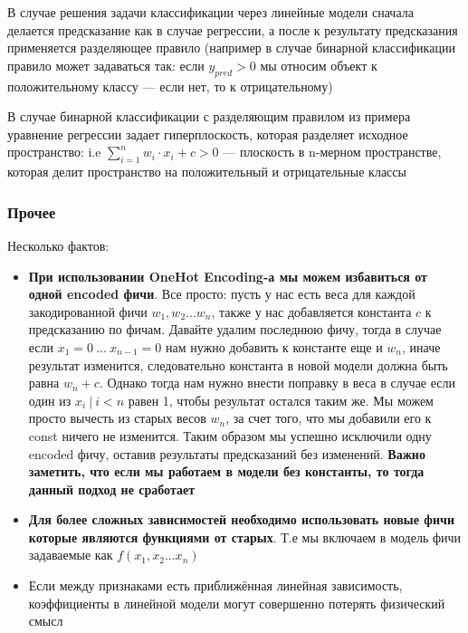 \documentclass{article}
\begin{document}
    В случае решения задачи классификации через линейные модели сначала делается предсказание как в случае регрессии, а после
    к результату предсказания применяется разделяющее правило (например в случае бинарной классификации правило может задаваться так:
    если $y_{pred} > 0$ мы относим объект к положительному классу --- если нет, то к отрицательному)

    В случае бинарной классификации с разделяющим правилом из примера уравнение регрессии задает гиперплоскость,
    которая разделяет исходное пространство: i.e $\sum_{i = 1}^{n}{w_{i} \cdot x_{i}} + c > 0$ --- плоскость в n-мерном пространстве,
    которая делит пространство на положительный и отрицательные классы

    \subsubsection{Прочее}

    Несколько фактов:

    \begin{itemize}
        \item \textbf{При использовании OneHot Encoding-а мы можем избавиться от одной encoded фичи}.
        Все просто: пусть у нас есть веса для каждой закодированной фичи $w_{1}, w_{2} ... w_{n}$, также у нас добавляется константа $c$
        к предсказанию по фичам.
        Давайте удалим последнюю фичу, тогда в случае если $x_{1} = 0 \ ... \ x_{n-1} = 0$ нам нужно добавить к константе еще и $w_{n}$, иначе результат изменится, следовательно
        константа в новой модели должна быть равна $w_{n} + c$. 
        Однако тогда нам нужно внести поправку в веса в случае если один из $x_{i} \ | \ i < n$ равен 1, чтобы
        результат остался таким же. 
        Мы можем просто вычесть из старых весов $w_{n}$, за счет того, что мы добавили его к const ничего не изменится.
        Таким образом мы успешно исключили одну encoded фичу, оставив результаты предсказаний без изменений. 
        \textbf{Важно заметить, что если мы работаем в модели без константы, то тогда данный подход не сработает}
        \item \textbf{Для более сложных зависимостей необходимо использовать новые фичи которые являются функциями от старых}.
        Т.е мы включаем в модель фичи задаваемые как $f(x_{1}, x_{2} ... x_{n})$
        \item Если между признаками есть приближённая линейная зависимость, коэффициенты в линейной модели могут совершенно потерять физический смысл
  
    \end{itemize}
    
\end{document}
